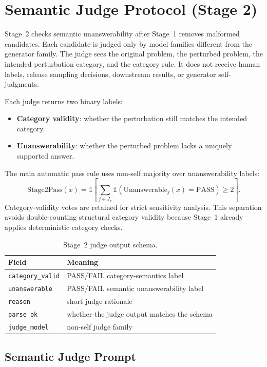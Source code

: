 \documentclass[10pt]{article}
\begin{document}
\section{Semantic Judge Protocol (Stage 2)}
\label{app:stage2}

Stage~2 checks semantic unanswerability after Stage~1 removes malformed candidates. Each candidate is judged only by model families different from the generator family. The judge sees the original problem, the perturbed problem, the intended perturbation category, and the category rule. It does not receive human labels, release sampling decisions, downstream results, or generator self-judgments.

Each judge returns two binary labels:
\begin{itemize}
  \item \textbf{Category validity}: whether the perturbation still matches the intended category.
  \item \textbf{Unanswerability}: whether the perturbed problem lacks a uniquely supported answer.
\end{itemize}

The main automatic pass rule uses non-self majority over unanswerability labels:
\[
  \mathrm{Stage2Pass}(x)=
  \mathbb{1}\left[\sum_{j\in J_x}
  \mathbb{1}(\mathrm{Unanswerable}_j(x)=\mathrm{PASS})\ge2\right].
\]
Category-validity votes are retained for strict sensitivity analysis. This separation avoids double-counting structural category validity because Stage~1 already applies deterministic category checks.

\begin{table}[!h]
\centering
\small
\caption{Stage~2 judge output schema.}
\label{tab:stage2-schema}
\begin{tabular}{ll}
\toprule
Field & Meaning \\
\midrule
\texttt{category\_valid} & PASS/FAIL category-semantics label \\
\texttt{unanswerable} & PASS/FAIL semantic unanswerability label \\
\texttt{reason} & short judge rationale \\
\texttt{parse\_ok} & whether the judge output matches the schema \\
\texttt{judge\_model} & non-self judge family \\
\bottomrule
\end{tabular}
\end{table}

\subsection{Semantic Judge Prompt}
\end{document}
